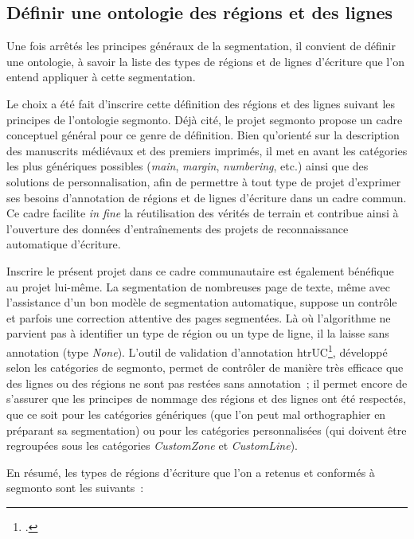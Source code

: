 \documentclass[a4paper,12pt,twoside]{book}
\begin{document}
			\subsection{Définir une ontologie des régions et des lignes}
				Une fois arrêtés les principes généraux de la segmentation, il convient de définir une ontologie, à savoir la liste des types de régions et de lignes d'écriture que l'on entend appliquer à cette segmentation.
				
				Le choix a été fait d'inscrire cette définition des régions et des lignes suivant les principes de l'ontologie \gls{segmonto}. Déjà cité, le projet \gls{segmonto} propose un cadre conceptuel général pour ce genre de définition. Bien qu'orienté sur la description des manuscrits médiévaux et des premiers imprimés, il met en avant les catégories les plus génériques possibles (\textit{main}, \textit{margin}, \textit{numbering}, etc.) ainsi que des solutions de personnalisation, afin de permettre à tout type de projet d'exprimer ses besoins d'annotation de régions et de lignes d'écriture dans un cadre commun. Ce cadre facilite \textit{in fine} la réutilisation des vérités de terrain et contribue ainsi à l'ouverture des données d'entraînements des projets de reconnaissance automatique d'écriture.
				
				Inscrire le présent projet dans ce cadre communautaire est également bénéfique au projet lui-même. La segmentation de nombreuses page de texte, même avec l'assistance d'un bon modèle de segmentation automatique, suppose un contrôle et parfois une correction attentive des pages segmentées. Là où l'algorithme ne parvient pas à identifier un type de région ou un type de ligne, il la laisse sans annotation (type \textit{None}). L'outil de validation d'annotation \gls{htr}UC\footcite{clericeHTRUCHTRUnitedCatalog2021}, développé selon les catégories de \gls{segmonto}, permet de contrôler de manière très efficace que des lignes ou des régions ne sont pas restées sans annotation~; il permet encore de s'assurer que les principes de nommage des régions et des lignes ont été respectés, que ce soit pour les catégories génériques (que l'on peut mal orthographier en préparant sa segmentation) ou pour les catégories personnalisées (qui doivent être regroupées sous les catégories \textit{CustomZone} et \textit{CustomLine}).
				
				En résumé, les types de régions d'écriture que l'on a retenus et conformés à \gls{segmonto} sont les suivants~:
				
\end{document}

